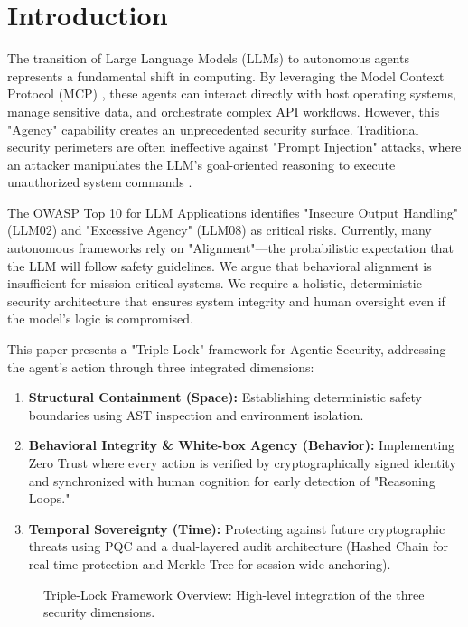 \documentclass[conference]{IEEEtran}
\begin{document}
\section{Introduction}
The transition of Large Language Models (LLMs) to autonomous agents represents a fundamental shift in computing. By leveraging the Model Context Protocol (MCP) \cite{mcp2024}, these agents can interact directly with host operating systems, manage sensitive data, and orchestrate complex API workflows. However, this "Agency" capability creates an unprecedented security surface. Traditional security perimeters are often ineffective against "Prompt Injection" attacks, where an attacker manipulates the LLM's goal-oriented reasoning to execute unauthorized system commands \cite{perez2022ignore}.

The OWASP Top 10 for LLM Applications \cite{owasp2023} identifies "Insecure Output Handling" (LLM02) and "Excessive Agency" (LLM08) as critical risks. Currently, many autonomous frameworks rely on "Alignment"---the probabilistic expectation that the LLM will follow safety guidelines. We argue that behavioral alignment is insufficient for mission-critical systems. We require a holistic, deterministic security architecture that ensures system integrity and human oversight even if the model's logic is compromised.

This paper presents a "Triple-Lock" framework for Agentic Security, addressing the agent's action through three integrated dimensions:
\begin{enumerate}
    \item \textbf{Structural Containment (Space):} Establishing deterministic safety boundaries using AST inspection and environment isolation.
    \item \textbf{Behavioral Integrity \& White-box Agency (Behavior):} Implementing Zero Trust where every action is verified by cryptographically signed identity and synchronized with human cognition for early detection of "Reasoning Loops."
    \item \textbf{Temporal Sovereignty (Time):} Protecting against future cryptographic threats using PQC and a dual-layered audit architecture (Hashed Chain for real-time protection and Merkle Tree for session-wide anchoring).
\end{enumerate}

\begin{figure}[htbp]
\centering
\resizebox{\columnwidth}{!}{
    
}
\caption{Triple-Lock Framework Overview: High-level integration of the three security dimensions.}
\label{fig:overview_arch}
\end{figure}
\end{document}
